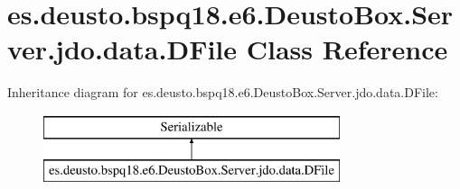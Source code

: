 \hypertarget{classes_1_1deusto_1_1bspq18_1_1e6_1_1_deusto_box_1_1_server_1_1jdo_1_1data_1_1_d_file}{}\section{es.\+deusto.\+bspq18.\+e6.\+Deusto\+Box.\+Server.\+jdo.\+data.\+D\+File Class Reference}
\label{classes_1_1deusto_1_1bspq18_1_1e6_1_1_deusto_box_1_1_server_1_1jdo_1_1data_1_1_d_file}
Inheritance diagram for es.\+deusto.\+bspq18.\+e6.\+Deusto\+Box.\+Server.\+jdo.\+data.\+D\+File\+:\begin{figure}[H]
\begin{center}
\leavevmode
\includegraphics[height=2.000000cm]{classes_1_1deusto_1_1bspq18_1_1e6_1_1_deusto_box_1_1_server_1_1jdo_1_1data_1_1_d_file}
\end{center}
\end{figure}
